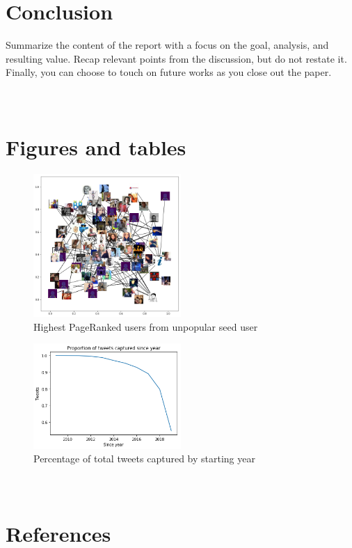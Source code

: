 \documentclass[12pt]{article}
\begin{document}
\section{Conclusion}
Summarize the content of the report with a focus on the goal, analysis, and resulting value. Recap relevant points from the discussion, but do not restate it. Finally, you can choose to touch on future works as you close out the paper.

\appendix
\section{\\Figures and tables}

\begin{figure}[h!]
    \centering
     \includegraphics[width=0.5\textwidth]{nxgraph_unpopular_seed}
        \caption{Highest PageRanked users from unpopular seed user}
\end{figure}

\begin{figure}[h!]
    \centering
     \includegraphics[width=0.5\textwidth]{tweets_since_year}
        \caption{Percentage of total tweets captured by starting year}
\end{figure}

\section{\\References}
\end{document}
